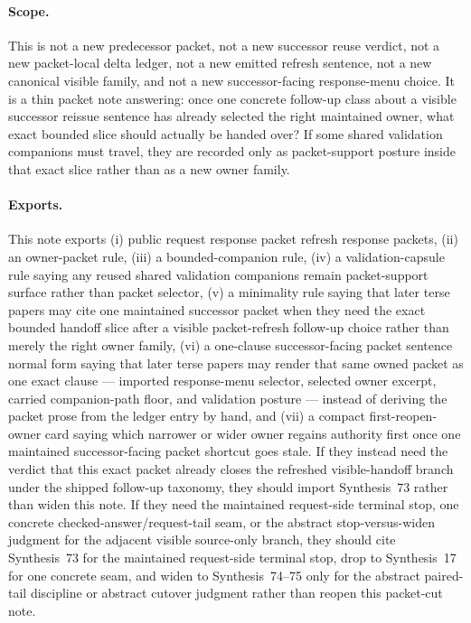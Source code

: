 \documentclass[11pt]{article}
\begin{document}
\paragraph{Scope.}
This is not a new predecessor packet, not a new successor reuse verdict, not a new packet-local delta ledger, not a new emitted refresh sentence, not a new canonical visible family, and not a new successor-facing response-menu choice.
It is a thin packet note answering: once one concrete follow-up class about a visible successor reissue sentence has already selected the right maintained owner, what exact bounded slice should actually be handed over? If some shared validation companions must travel, they are recorded only as packet-support posture inside that exact slice rather than as a new owner family.

\paragraph{Exports.}
This note exports (i) public request response packet refresh response packets, (ii) an owner-packet rule, (iii) a bounded-companion rule, (iv) a validation-capsule rule saying any reused shared validation companions remain packet-support surface rather than packet selector, (v) a minimality rule saying that later terse papers may cite one maintained successor packet when they need the exact bounded handoff slice after a visible packet-refresh follow-up choice rather than merely the right owner family, (vi) a one-clause successor-facing packet sentence normal form saying that later terse papers may render that same owned packet as one exact clause --- imported response-menu selector, selected owner excerpt, carried companion-path floor, and validation posture --- instead of deriving the packet prose from the ledger entry by hand, and (vii) a compact first-reopen-owner card saying which narrower or wider owner regains authority first once one maintained successor-facing packet shortcut goes stale. If they instead need the verdict that this exact packet already closes the refreshed visible-handoff branch under the shipped follow-up taxonomy, they should import Synthesis~73 rather than widen this note. If they need the maintained request-side terminal stop, one concrete checked-answer/request-tail seam, or the abstract stop-versus-widen judgment for the adjacent visible source-only branch, they should cite Synthesis~73 for the maintained request-side terminal stop, drop to Synthesis~17 for one concrete seam, and widen to Synthesis~74--75 only for the abstract paired-tail discipline or abstract cutover judgment rather than reopen this packet-cut note.
\end{document}
